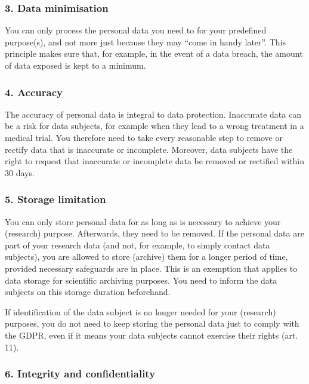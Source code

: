 \documentclass[
]{book}
\begin{document}
\hypertarget{data-minimisation}{%
\subsubsection{3. Data minimisation}\label{data-minimisation}}

You can only process the personal data you need to for your predefined purpose(s),
and not more just because they may ``come in handy later''. This principle makes
sure that, for example, in the event of a data breach, the amount of data exposed
is kept to a minimum.

\hypertarget{accuracy}{%
\subsubsection{4. Accuracy}\label{accuracy}}

The accuracy of personal data is integral to data protection. Inaccurate data
can be a risk for data subjects, for example when they lead to a wrong treatment
in a medical trial. You therefore need to take every reasonable step to remove
or rectify data that is inaccurate or incomplete. Moreover, data subjects have
the right to request that inaccurate or
incomplete data be removed or rectified within 30 days.

\hypertarget{storage-limitation}{%
\subsubsection{5. Storage limitation}\label{storage-limitation}}

You can only store personal data for as long as is
necessary to achieve your (research) purpose. Afterwards, they need to be
removed. If the personal data are part of your research data (and not, for
example, to simply contact data subjects), you are allowed to store (archive)
them for a longer period of time, provided necessary safeguards are in place.
This is an exemption that applies to data storage for scientific archiving
purposes. You need to inform the data subjects on this storage duration beforehand.

If identification of the data subject is no longer needed for your
(research) purposes, you do not need to keep storing the personal data just
to comply with the GDPR, even if it means your data subjects cannot exercise
their rights (art. 11).

\hypertarget{integrity-and-confidentiality}{%
\subsubsection{6. Integrity and confidentiality}\label{integrity-and-confidentiality}}
\end{document}
